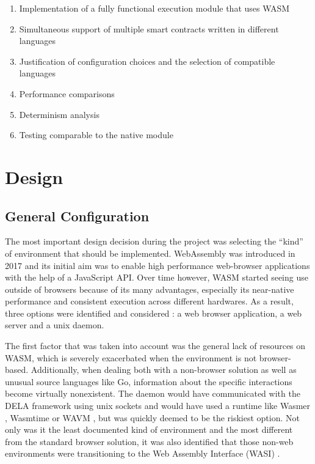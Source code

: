 \documentclass[11pt, a4paper, twoside, openright]{article}
\begin{document}
\begin{enumerate} 

\itemsep0em

 \item Implementation of a fully functional execution module that uses WASM
 \item Simultaneous support of multiple smart contracts written in different languages
 \item Justification of configuration choices and the selection of compatible languages
 \item Performance comparisons
 \item Determinism analysis
 \item Testing comparable to the native module

\end{enumerate} 
\newpage

\section{Design}

\subsection{General Configuration}
The most important design decision during the project was selecting the ``kind'' of environment that should be implemented. WebAssembly was introduced in 2017 and its initial aim was to enable high performance web-browser applications with the help of a JavaScript API. Over time however, WASM started seeing use outside of browsers because of its many advantages, especially its near-native performance and consistent execution across different hardwares. As a result, three options were identified and considered : a web browser application, a web server and a unix daemon.

The first factor that was taken into account was the general lack of resources on WASM, which is severely exacerbated when the environment is not browser-based. Additionally, when dealing both with a non-browser solution as well as unusual source languages like Go, information about the specific interactions become virtually nonexistent. The daemon would have communicated with the DELA framework using unix sockets and would have used a runtime like Wasmer \cite{wasmer}, Wasmtime \cite{wasmtime} or WAVM \cite{wavm}, but was quickly deemed to be the riskiest option. Not only was it the least documented kind of environment and the most different from the standard browser solution, it was also identified that those non-web environments were transitioning to the Web Assembly Interface (WASI) \cite{wasi}.
\end{document}
